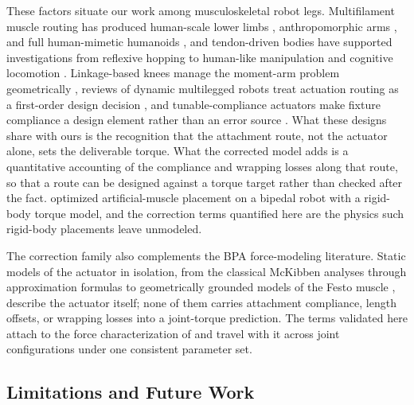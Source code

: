 \documentclass[utf8]{FrontiersinHarvard} %
\begin{document}
These factors situate our work among musculoskeletal robot legs. Multifilament muscle routing has produced human-scale lower limbs \citep{kurumaya_musculoskeletal_2016}, anthropomorphic arms \citep{hitzmann_anthropomorphic_2018}, and full human-mimetic humanoids \citep{asano_musculoskeletal_2019}, and tendon-driven bodies have supported investigations from reflexive hopping \citep{liu_robotic_2018} to human-like manipulation \citep{chen_realizing_2019} and cognitive locomotion \citep{schilling_adaptive_2022}. Linkage-based knees manage the moment-arm problem geometrically \citep{romero_four-bar_2020}, reviews of dynamic multilegged robots treat actuation routing as a first-order design decision \citep{he_mechanism_2020}, and tunable-compliance actuators make fixture compliance a design element rather than an error source \citep{leibach_development_2020}. What these designs share with ours is the recognition that the attachment route, not the actuator alone, sets the deliverable torque. What the corrected model adds is a quantitative accounting of the compliance and wrapping losses along that route, so that a route can be designed against a torque target rather than checked after the fact. \citet{morrow_optimization_2020} optimized artificial-muscle placement on a bipedal robot with a rigid-body torque model, and the correction terms quantified here are the physics such rigid-body placements leave unmodeled.

The correction family also complements the BPA force-modeling literature. Static models of the actuator in isolation, from the classical McKibben analyses \citep{chou_measurement_1996} through approximation formulas \citep{sarosi_new_2012} to geometrically grounded models of the Festo muscle \citep{martens_modeling_2017, tondu_static_2022}, describe the actuator itself; none of them carries attachment compliance, length offsets, or wrapping losses into a joint-torque prediction. The terms validated here attach to the force characterization of \citet{bolen_2026} and travel with it across joint configurations under one consistent parameter set.

\subsection{Limitations and Future Work}\label{sec:limitations}
\end{document}
